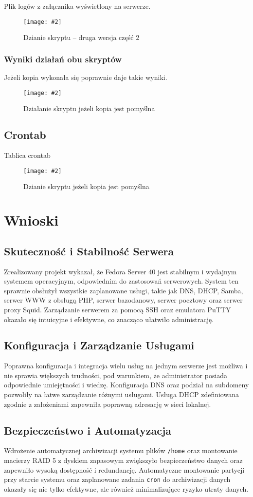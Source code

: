 \documentclass[a4paper]{article}
\newcommand*{\zdj}[2][\textwidth]{\texttt{[image: \#2]}}
\newcommand*{\fg}[4][!htb]{
      \begin{figure*}[#1]
            \zdj{#2}
            \caption[#4]{#3}
      \end{figure*}
}
\begin{document}
\newpage
Plik logów z załącznika wyświetlony na serwerze.
\fg{contents/configuration/skrypt/12.png}{Dzianie skryptu – druga wersja część 2}{Dzianie skryptu – druga wersja część 2}

\subsubsection{Wyniki działań obu skryptów}
Jeżeli kopia wykonała się poprawnie daje takie wyniki.

\fg{contents/configuration/skrypt/7.png}{Działanie skryptu jeżeli kopia jest pomyślna}{Działanie skryptu jeżeli kopia jest pomyślna}

\newpage
\subsection{Crontab}
Tablica crontab
\fg{contents/configuration/skrypt/5.png}{Dzianie skryptu jeżeli kopia jest pomyślna}{Dzianie skryptu jeżeli kopia jest pomyślna}
\newpage
\section{Wnioski}
\subsection{Skuteczność i Stabilność Serwera}
Zrealizowany projekt wykazał, że Fedora Server 40 jest stabilnym i wydajnym systemem operacyjnym, odpowiednim do zastosowań serwerowych. System ten sprawnie obsłużył wszystkie zaplanowane usługi, takie jak DNS, DHCP, Samba, serwer WWW z obsługą PHP, serwer bazodanowy, serwer pocztowy oraz serwer proxy Squid. Zarządzanie serwerem za pomocą SSH oraz emulatora PuTTY okazało się intuicyjne i efektywne, co znacząco ułatwiło administrację.

\subsection{Konfiguracja i Zarządzanie Usługami}
Poprawna konfiguracja i integracja wielu usług na jednym serwerze jest możliwa i nie sprawia większych trudności, pod warunkiem, że administrator posiada odpowiednie umiejętności i wiedzę. Konfiguracja DNS oraz podział na subdomeny pozwoliły na łatwe zarządzanie różnymi usługami. Usługa DHCP zdefiniowana zgodnie z założeniami zapewniła poprawną adresację w sieci lokalnej.

\subsection{Bezpieczeństwo i Automatyzacja}
Wdrożenie automatycznej archiwizacji systemu plików \texttt{/home} oraz montowanie macierzy RAID 5 z dyskiem zapasowym zwiększyło bezpieczeństwo danych oraz zapewniło wysoką dostępność i redundancję. Automatyczne montowanie partycji przy starcie systemu oraz zaplanowane zadania \texttt{cron} do archiwizacji danych okazały się nie tylko efektywne, ale również minimalizujące ryzyko utraty danych.
\end{document}
